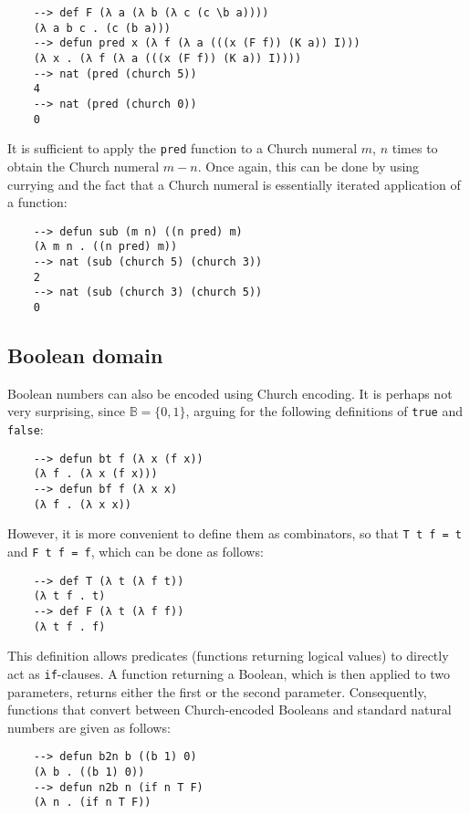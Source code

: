 \begin{Verbatim}
    --> def F (λ a (λ b (λ c (c \b a))))
    (λ a b c . (c (b a)))
    --> defun pred x (λ f (λ a (((x (F f)) (K a)) I)))
    (λ x . (λ f (λ a (((x (F f)) (K a)) I))))
    --> nat (pred (church 5))
    4
    --> nat (pred (church 0))
    0
\end{Verbatim}

It is sufficient to apply the \verb|pred| function to a Church numeral $m$, $n$ times to obtain the Church numeral $m - n$. Once again, this can be done by using currying and the fact that a Church numeral is essentially iterated application of a function:

\begin{Verbatim}
    --> defun sub (m n) ((n pred) m)
    (λ m n . ((n pred) m))
    --> nat (sub (church 5) (church 3))
    2
    --> nat (sub (church 3) (church 5))
    0
\end{Verbatim}

\subsection{Boolean domain}

Boolean numbers can also be encoded using Church encoding. It is perhaps not very surprising, since $\mathbb{B} = \{0, 1\}$, arguing for the following definitions of \verb|true| and \verb|false|:

\begin{Verbatim}
    --> defun bt f (λ x (f x))
    (λ f . (λ x (f x)))
    --> defun bf f (λ x x)
    (λ f . (λ x x))
\end{Verbatim}

However, it is more convenient to define them as combinators, so that \verb|T t f = t| and \verb|F t f = f|, which can be done as follows:

\begin{Verbatim}
    --> def T (λ t (λ f t))
    (λ t f . t)
    --> def F (λ t (λ f f))
    (λ t f . f)
\end{Verbatim}

This definition allows predicates (functions returning logical values) to directly act as \verb|if|-clauses. A function returning a Boolean, which is then applied to two parameters, returns either the first or the second parameter. Consequently, functions that convert between Church-encoded Booleans and standard natural numbers are given as follows:

\begin{Verbatim}
    --> defun b2n b ((b 1) 0)
    (λ b . ((b 1) 0))
    --> defun n2b n (if n T F)
    (λ n . (if n T F))
\end{Verbatim}

